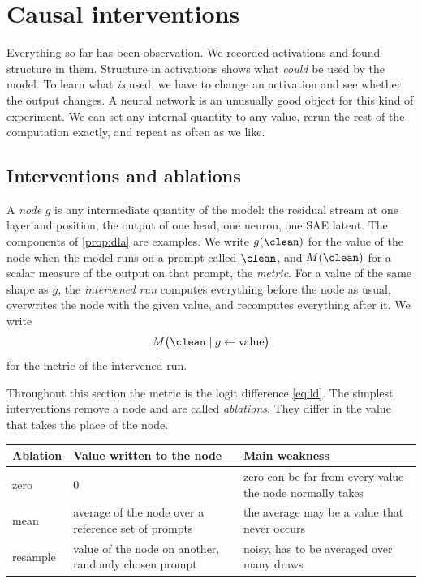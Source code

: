 \section{Causal interventions}
\label{sec:interventions}

Everything so far has been observation. We recorded activations and found structure in them. Structure in
activations shows what \emph{could} be used by the model. To learn what \emph{is} used, we have to change an
activation and see whether the output changes. A neural network is an unusually good object for this kind of
experiment. We can set any internal quantity to any value, rerun the rest of the computation exactly, and
repeat as often as we like.

\subsection{Interventions and ablations}

\begin{definition}[Intervention]\label{def:intervention}
A \emph{node} $g$ is any intermediate quantity of the model: the residual stream at one layer and position, the
output of one head, one neuron, one SAE latent. The components of \cref{prop:dla} are examples. We write $g(\clean)$ for the value of the node when the model
runs on a prompt called $\clean$, and $M(\clean)$ for a scalar measure of the output on that prompt, the
\emph{metric}. For a value of the same shape as $g$, the \emph{intervened run} computes everything before the
node as usual, overwrites the node with the given value, and recomputes everything after it. We write
\[
M\big(\clean \mid g\leftarrow\text{value}\big)
\]
for the metric of the intervened run.
\end{definition}

Throughout this section the metric is the logit difference \eqref{eq:ld}. The simplest interventions remove a
node and are called \emph{ablations}. They differ in the value that takes the place of the node.

\begin{center}\small
\begin{tabular}{@{}lp{}p{}@{}}
\toprule
Ablation & Value written to the node & Main weakness \\
\midrule
zero & $0$ & zero can be far from every value the node normally takes \\
mean & average of the node over a reference set of prompts & the average may be a value that never occurs \\
resample & value of the node on another, randomly chosen prompt & noisy, has to be averaged over many draws \\
\bottomrule
\end{tabular}
\end{center}

